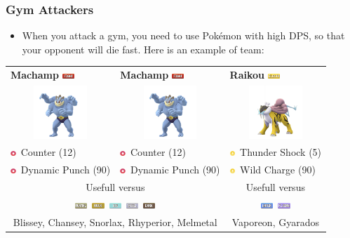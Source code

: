 \documentclass[12pt]{beamer}
\newcommand{\fightingfull}{\includegraphics[height=0.2cm]{../../images/type/full/Fighting.png}}
\newcommand{\darkfull}{\includegraphics[height=0.2cm]{../../images/type/full/Dark.png}}
\newcommand{\electricfull}{\includegraphics[height=0.2cm]{../../images/type/full/Electric.png}}
\newcommand{\flyingfull}{\includegraphics[height=0.2cm]{../../images/type/full/Flying.png}}
\newcommand{\icefull}{\includegraphics[height=0.2cm]{../../images/type/full/Ice.png}}
\newcommand{\normalfull}{\includegraphics[height=0.2cm]{../../images/type/full/Normal.png}}
\newcommand{\rockfull}{\includegraphics[height=0.2cm]{../../images/type/full/Rock.png}}
\newcommand{\waterfull}{\includegraphics[height=0.2cm]{../../images/type/full/Water.png}}
\newcommand{\steelfull}{\includegraphics[height=0.2cm]{../../images/type/full/Steel.png}}
\newcommand{\fightingsimp}{\includegraphics[height=0.2cm]{../../images/type/simplified/fighting.png}}
\newcommand{\electricsimp}{\includegraphics[height=0.2cm]{../../images/type/simplified/electric.png}}
\begin{document}
\begin{frame}
\frametitle{Gym Attackers}

\begin{block}{}
\begin{footnotesize}

\begin{itemize}
\item When you attack a gym, you need to use Pok\'emon with high DPS, so that your opponent will die fast. Here is an example of team:
\end{itemize}

\begin{center}
\begin{tabular}{p{3cm}p{3cm}p{3cm}} 
\textbf{Machamp} \hfill \fightingfull & \textbf{Machamp} \hfill \fightingfull&  \textbf{Raikou} \hfill \electricfull  \\ 
\multicolumn{1}{c}{\includegraphics[width=2cm]{../../images/pokemon/Machamp}} &  \multicolumn{1}{c}{\includegraphics[width=2cm]{../../images/pokemon/Machamp}} &   \multicolumn{1}{c}{\includegraphics[width=2cm]{../../images/pokemon/Raikou} }   \\ \hline
\fightingsimp~Counter (12)  & \fightingsimp~Counter (12) & \electricsimp~Thunder Shock (5)   \\
 \fightingsimp~Dynamic Punch (90)    &\fightingsimp~Dynamic Punch (90) &\electricsimp~Wild Charge (90) \\  \hline
 \multicolumn{2}{c}{Usefull versus} &  \multicolumn{1}{c}{Usefull versus}   \\
\multicolumn{2}{c}{\normalfull~\rockfull~\icefull~\steelfull~\darkfull} & \multicolumn{1}{c}{\waterfull~\flyingfull}  \\
\multicolumn{2}{c}{Blissey, Chansey, Snorlax, Rhyperior, Melmetal} & \multicolumn{1}{c}{Vaporeon, Gyarados} \\
\end{tabular}


\end{center}
\end{footnotesize}
\end{block}
\end{frame}
\end{document}
